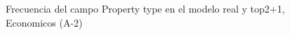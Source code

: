 \begin{figure}[H]
    \centering
    
    \caption{Frecuencia del campo Property type en el modelo real y top2+1, Economicos (A-2)}
    \label{frecuency-Property Type-top2+1}
\end{figure}